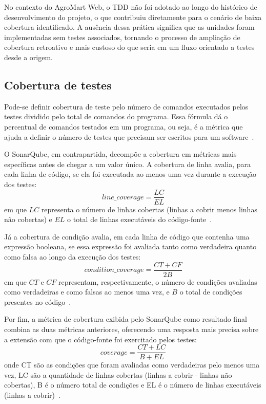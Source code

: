 No contexto do AgroMart Web, o TDD não foi adotado ao longo do histórico de desenvolvimento do projeto, o que contribuiu diretamente para o cenário de baixa cobertura identificado.
A ausência dessa prática significa que as unidades foram implementadas sem testes associados, tornando o processo de ampliação de cobertura retroativo e mais custoso do que seria em um fluxo orientado a testes desde a origem.

\subsection{Cobertura de testes}

Pode-se definir cobertura de teste pelo número de comandos executados pelos testes dividido pelo total de comandos do programa.
Essa fórmula dá o percentual de comandos testados em um programa, ou seja, é a métrica que ajuda a definir o número de testes que precisam ser escritos para um software~\cite{valente2020engenharia}.

O SonarQube, em contrapartida, decompõe a cobertura em métricas mais específicas antes de chegar a um valor único.
A cobertura de linha avalia, para cada linha de código, se ela foi executada ao menos uma vez durante a execução dos testes:
\begin{equation}
\textit{line\_coverage} = \frac{LC}{EL}
\label{eq:lineCoverage}
\end{equation}
em que $LC$ representa o número de linhas cobertas (linhas a cobrir menos linhas não cobertas) e $EL$ o total de linhas executáveis do código-fonte~\cite{sonarqube_metricdefs,gallaba_sonarmetrics}.

Já a cobertura de condição avalia, em cada linha de código que contenha uma expressão booleana, se essa expressão foi avaliada tanto como verdadeira quanto como falsa ao longo da execução dos testes:
\begin{equation}
\textit{condition\_coverage} = \frac{CT + CF}{2B}
\label{eq:conditionCoverage}
\end{equation}
em que $CT$ e $CF$ representam, respectivamente, o número de condições avaliadas como verdadeiras e como falsas ao menos uma vez, e $B$ o total de condições presentes no código~\cite{sonarqube_metricdefs,gallaba_sonarmetrics}.

Por fim, a métrica de cobertura exibida pelo SonarQube como resultado final combina as duas métricas anteriores, oferecendo uma resposta mais precisa sobre a extensão com que o código-fonte foi exercitado pelos testes:
\begin{equation}
coverage = \frac{CT + LC}{B + EL}
\label{eq:coverageSonar}
\end{equation}
onde CT são as condições que foram avaliadas como verdadeiras pelo menos uma vez, LC são a quantidade de linhas cobertas (linhas a cobrir - linhas não cobertas),
B é o número total de condições e EL é o número de linhas executáveis (linhas a cobrir)~\cite{sonarqube_metricdefs}.

